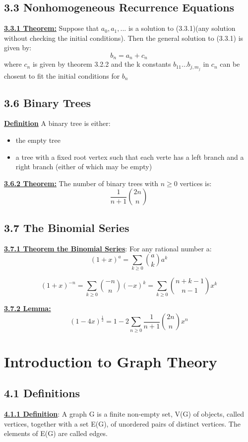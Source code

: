 \documentclass[12pt]{article}
\newcommand{\myt}[1]{\textbf{\underline{#1}}}
\begin{document}
	\subsection*{3.3 Nonhomogeneous Recurrence Equations}
	
	\myt{3.3.1 Theorem:} Suppose that $a_0, a_1, ...$ is a solution to (3.3.1)(any solution without checking the initial conditions). Then the general solution to (3.3.1) is given by:\\
	$$b_n = a_n + c_n$$
	where $c_n$ is given by theorem 3.2.2 and the k constants $b_{11} ... b_{j,m_j}$ in $c_n$ can be chosent to fit the initial conditions for $b_n$\\
	
	\subsection*{3.6 Binary Trees}
	\myt{Definition} A binary tree is either:\\
	\begin{itemize}
		\item the empty tree
		\item a tree with a fixed root vertex such that each verte has a left branch and a right branch (either of which may be empty)
	\end{itemize}
	
	\myt{3.6.2 Theorem:} The number of binary trees with $n \geq 0$ vertices is:\\
	$$\frac{1}{n+1}{2n \choose n}$$
	
	\subsection*{3.7 The Binomial Series}
	\myt{3.7.1 Theorem the Binomial Series}: For any rational number a:\\
	$$(1 + x)^a = \sum_{k \geq 0}{a \choose k}a^k$$
	
	$$(1+x)^{-n} = \sum_{k \geq 0}{-n \choose n}(-x)^k = \sum_{k \geq 0}{n + k - 1 \choose n-1}x^k$$
	
	\myt{3.7.2 Lemma:}\\
	$$(1-4x)^{\frac{1}{2}} = 1-2\sum_{n \geq 0}\frac{1}{n+1}{2n \choose n}x^n$$
		
	\section{Introduction to Graph Theory}
	\subsection*{4.1 Definitions}
	\myt{4.1.1 Definition}: A graph G is a finite non-empty set, V(G) of objects, called vertices, together with a set E(G), of unordered pairs of distinct vertices. The elements of E(G) are called edges.
	
\end{document}
